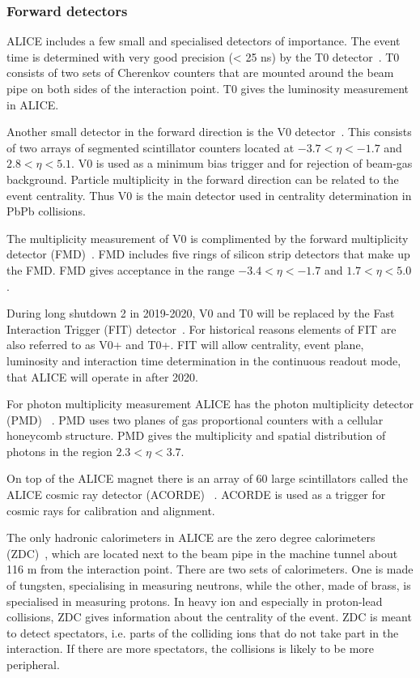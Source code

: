 \subsubsection{Forward detectors}
\label{sec:forward}
ALICE includes a few small and specialised detectors of importance. The event time is determined with very good precision (< 25 ns) by the T0 detector~\cite{T0}. T0 consists of two sets of Cherenkov counters that are mounted around the beam pipe on both sides of the interaction point. T0 gives the luminosity measurement in ALICE.

Another small detector in the forward direction is the V0 detector~\cite{V0}. This consists of two arrays of segmented scintillator counters located at $-3.7 < \eta < -1.7$ and $ 2.8 < \eta < 5.1$. V0 is used as a minimum bias trigger and for rejection of beam-gas background. Particle multiplicity in the forward direction can be related to the event centrality. Thus V0 is the main detector used in centrality determination in PbPb collisions.

The multiplicity measurement of V0 is complimented by the forward multiplicity detector (FMD)~\cite{FMD}. FMD includes five rings of silicon strip detectors that make up the FMD. FMD gives acceptance in the range $-3.4 < \eta < -1.7$ and $ 1.7 < \eta < 5.0$.

During long shutdown 2 in 2019-2020, V0 and T0 will be replaced by the Fast Interaction Trigger (FIT) detector~\cite{FIT}. For historical reasons elements of FIT are also referred to as V0+ and T0+. FIT will allow centrality, event plane, luminosity and interaction time determination in the continuous readout mode, that ALICE will operate in after 2020.

For photon multiplicity measurement ALICE has the photon multiplicity detector (PMD) ~\cite{PMD}. PMD uses two planes of gas proportional counters with a cellular honeycomb structure. PMD gives the multiplicity and spatial distribution of photons in the region $2.3 < \eta < 3.7$.

On top of the ALICE magnet there is an array of 60 large scintillators called the ALICE cosmic ray detector (ACORDE) ~\cite{acorde}. ACORDE is used as a trigger for cosmic rays for calibration and alignment. 

The only hadronic calorimeters in ALICE are the zero degree calorimeters (ZDC)~\cite{zdc}, which are located next to the beam pipe in the machine tunnel about 116 m from the interaction point. There are two sets of calorimeters. One is made of tungsten, specialising in measuring neutrons, while the other, made of brass, is specialised in measuring protons. In heavy ion and especially in proton-lead collisions, ZDC gives information about the centrality of the event. ZDC is meant to detect spectators, i.e. parts of the colliding ions that do not take part in the interaction. If there are more spectators, the collisions is likely to be more peripheral.

